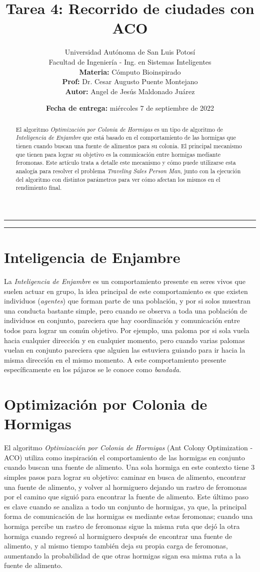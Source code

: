 \documentclass[12pt, a4paper]{article}
\title{\vspace{-3cm}Tarea 4: Recorrido de ciudades con ACO}
\author{
    Universidad Autónoma de San Luis Potosí\\ 
    Facultad de Ingeniería - Ing. en Sistemas Inteligentes\\ 
    \textbf{Materia:} Cómputo Bioinspirado \\
    \textbf{Prof:} Dr. Cesar Augusto Puente Montejano  \\
    \textbf{Autor:} Angel de Jesús Maldonado Juárez
}
\date{\textbf{Fecha de entrega:} miércoles 7 de septiembre de 2022}
\begin{document}
\maketitle

\begin{center}
    \rule{\textwidth}{0.5pt}
    \begin{abstract}
        \noindent El algoritmo \emph{Optimización por Colonia de Hormigas} es un tipo de algoritmo de \emph{Inteligencia de Enjambre} que está basado en el comportamiento de las hormigas que tienen cuando buscan una fuente de alimentos para su colonia. El principal mecanismo que tienen para lograr su objetivo es la comunicación entre hormigas mediante feromonas. Este artículo trata a detalle este mecanismo y cómo puede utilizarse esta analogía para resolver el problema \emph{Traveling Sales Person Man}, junto con la ejecución del algoritmo con distintos parámetros para ver cómo afectan los mismos en el rendimiento final.
    \end{abstract}
    \rule{\textwidth}{0.5pt}
\end{center}

\section{Inteligencia de Enjambre}\label{title1}
La \emph{Inteligencia de Enjambre} es un comportamiento presente en seres vivos que suelen actuar en grupo, la idea principal de este comportamiento es que existen individuos (\emph{agentes}) que forman parte de una población, y por si solos muestran una conducta bastante simple, pero cuando se observa a toda una población de individuos en conjunto, pareciera que hay coordinación y comunicación entre todos para lograr un común objetivo. Por ejemplo, una paloma por si sola vuela hacia cualquier dirección y en cualquier momento, pero cuando varias palomas vuelan en conjunto pareciera que alguien las estuviera guiando para ir hacia la misma dirección en el mismo momento. A este comportamiento presente específicamente en los pájaros se le conoce como \emph{bandada}.

\section{Optimización por Colonia de Hormigas}
El algoritmo \emph{Optimización por Colonia de Hormigas} (Ant Colony Optimization - ACO) utiliza como inspiración el comportamiento de las hormigas en conjunto cuando buscan una fuente de alimento. Una sola hormiga en este contexto tiene 3 simples pasos para lograr su objetivo: caminar en busca de alimento, encontrar una fuente de alimento, y volver al hormiguero dejando un rastro de feromonas por el camino que siguió para encontrar la fuente de alimento. Este último paso es clave cuando se analiza a todo un conjunto de hormigas, ya que, la principal forma de comunicación de las hormigas es mediante estas feromonas; cuando una hormiga percibe un rastro de feromonas sigue la misma ruta que dejó la otra hormiga cuando regresó al hormiguero después de encontrar una fuente de alimento, y al mismo tiempo también deja su propia carga de feromonas, aumentando la probabilidad de que otras hormigas sigan esa misma ruta a la fuente de alimento.
\end{document}
